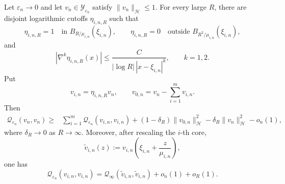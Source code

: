 \documentclass[10pt,a4paper]{amsart}
\begin{document}
\begin{lemma}\label{lem:quadratic-localization}
Let $\varepsilon_n\to0$ and let
$v_n\in\mathcal Y_{\varepsilon_n}$ satisfy
$\|v_n\|_{\mathcal H}\leq1$. For every large $R$, there are disjoint
logarithmic cutoffs $\eta_{i,n,R}$ such that
\[
\eta_{i,n,R}=1
\quad\text{in }B_{R/\mu_{i,n}}(\xi_{i,n}),
\qquad
\eta_{i,n,R}=0
\quad\text{outside }B_{R^2/\mu_{i,n}}(\xi_{i,n}),
\]
and
\begin{equation}\label{eq:quadratic-localization-cutoff}
|\nabla^k\eta_{i,n,R}(x)|
\leq
\frac{C}{|\log R|\,|x-\xi_{i,n}|^k},
\qquad k=1,2.
\end{equation}
Put
\[
v_{i,n}=\eta_{i,n,R}v_n,
\qquad
v_{0,n}=v_n-\sum_{i=1}^m v_{i,n}.
\]
Then
\begin{equation}\label{eq:quadratic-localization}
\begin{aligned}
\mathcal Q_{\varepsilon_n}(v_n,v_n)
\geq{}&
\sum_{i=1}^m
\mathcal Q_{\varepsilon_n}(v_{i,n},v_{i,n})
+(1-\delta_R)\|v_{0,n}\|_{\mathcal H}^2 -\delta_R\|v_n\|_{\mathcal H}^2-o_n(1),
\end{aligned}
\end{equation}
where $\delta_R\to0$ as $R\to\infty$. Moreover, after rescaling the
$i$-th core,
\[
\widetilde v_{i,n}(z)
:=v_{i,n}\left(\xi_{i,n}+\frac z{\mu_{i,n}}\right),
\]
one has
\begin{equation}\label{eq:quadratic-core-limit}
\mathcal Q_{\varepsilon_n}(v_{i,n},v_{i,n})
=
\mathcal Q_\infty(\widetilde v_{i,n},\widetilde v_{i,n})
+o_n(1)+o_R(1).
\end{equation}
\end{lemma}
\end{document}
